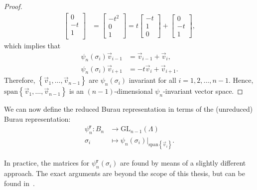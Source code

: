 \begin{proof}
\begin{align*}
\begin{bmatrix}
            0 \\ -t \\ 1 \\
        \end{bmatrix} &= \begin{bmatrix}
            -t^2 \\ 0 \\ 1
        \end{bmatrix} = t\begin{bmatrix}
            -t \\ 1 \\ 0
        \end{bmatrix} + \begin{bmatrix}
            0 \\ -t \\ 1
        \end{bmatrix},
    \end{align*}
    which implies that
    \begin{align*}
        \psi_n(\sigma_i)\vec{v}_{i-1} &= \vec{v}_{i-1} + \vec{v}_{i}, \\
        \psi_n(\sigma_i)\vec{v}_{i+1} &= - t\vec{v}_{i} + \vec{v}_{i+1}.
    \end{align*}
    Therefore, $\left\{ \vec{v}_1,\dots,\vec{v}_{n-1} \right\}$ are $\psi_n(\sigma_i)$ invariant for all $i=1,2,\dots,n-1$. Hence, $\textrm{span}\left\{ \vec{v}_1,\dots,\vec{v}_{n-1} \right\}$ is an $(n-1)$-dimensional $\psi_n$-invariant vector space.
\end{proof}

We can now define the reduced Burau representation in terms of the (unreduced) Burau representation:
\begin{align}
    \psi_n^\textbf{r}:B_n&\to\textrm{GL}_{n-1}(\Lambda) \\
    \sigma_i&\mapsto \psi_n(\sigma_i)\bigr|_{\textrm{span}\left\{ \vec{v}_i \right\}}.
\end{align}

In practice, the matrices for $\psi_n^\textbf{r}(\sigma_i)$ are found by means of a slightly different approach. The exact arguments are beyond the scope of this thesis, but can be found in~\cite{Palmer2022}.

